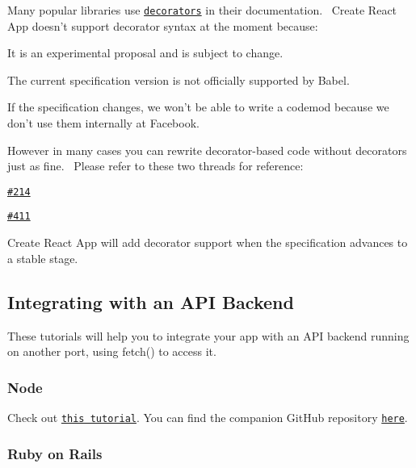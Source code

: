 Many popular libraries use \href{https://medium.com/google-developers/exploring-es7-decorators-76ecb65fb841}{\tt decorators} in their documentation.~\newline
 Create React App doesn’t support decorator syntax at the moment because\+:


\begin{DoxyItemize}
\item It is an experimental proposal and is subject to change.
\item The current specification version is not officially supported by Babel.
\item If the specification changes, we won’t be able to write a codemod because we don’t use them internally at Facebook.
\end{DoxyItemize}

However in many cases you can rewrite decorator-\/based code without decorators just as fine.~\newline
 Please refer to these two threads for reference\+:


\begin{DoxyItemize}
\item \href{https://github.com/facebookincubator/create-react-app/issues/214}{\tt \#214}
\item \href{https://github.com/facebookincubator/create-react-app/issues/411}{\tt \#411}
\end{DoxyItemize}

Create React App will add decorator support when the specification advances to a stable stage.

\subsection*{Integrating with an A\+PI Backend}

These tutorials will help you to integrate your app with an A\+PI backend running on another port, using {\ttfamily fetch()} to access it.

\subsubsection*{Node}

Check out \href{https://www.fullstackreact.com/articles/using-create-react-app-with-a-server/}{\tt this tutorial}. You can find the companion Git\+Hub repository \href{https://github.com/fullstackreact/food-lookup-demo}{\tt here}.

\subsubsection*{Ruby on Rails}

